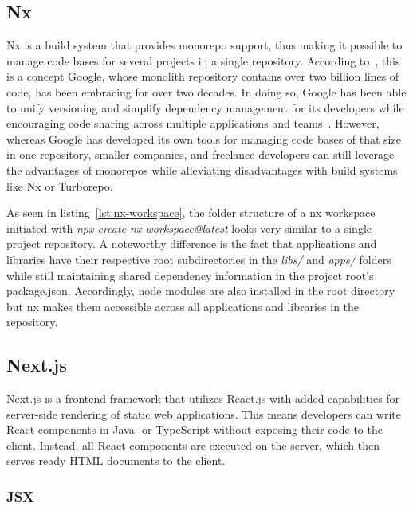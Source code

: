 \subsection{Nx}\label{subsec:nx}

Nx is a build system that provides monorepo support, thus making it possible to manage code bases for several projects in a single repository.
According to~\autocite[80]{potvin_why_2016}, this is a concept Google, whose monolith repository contains over two billion lines of code, has been embracing for over two decades.
In doing so, Google has been able to unify versioning and simplify dependency management for its developers while encouraging code sharing across multiple applications and teams~\autocite[84]{potvin_why_2016}.
However, whereas Google has developed its own tools for managing code bases of that size in one repository, smaller companies, and freelance developers can still leverage the advantages of monorepos while alleviating disadvantages with build systems like Nx or Turborepo.

As seen in listing~\ref{lst:nx-workspace}, the folder structure of a nx workspace initiated with \emph{npx create-nx-workspace@latest} looks very similar to a single project repository.
A noteworthy difference is the fact that applications and libraries have their respective root subdirectories in the \emph{libs/} and \emph{apps/} folders while still maintaining shared dependency information in the project root's package.json.
Accordingly, node modules are also installed in the root directory but nx makes them accessible across all applications and libraries in the repository.


\subsection{Next.js}\label{subsec:next.js}

Next.js is a frontend framework that utilizes React.js with added capabilities for server-side rendering of static web applications.
This means developers can write React components in Java- or TypeScript without exposing their code to the client.
Instead, all React components are executed on the server, which then serves ready \gls{HTML} documents to the client.

\subsubsection{JSX}\label{subsubsec:jsx}

